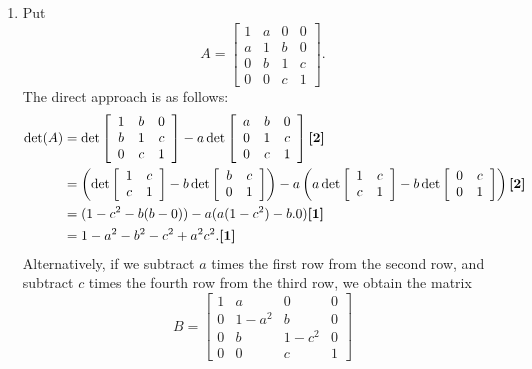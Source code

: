 \documentclass{amsart}
\renewcommand{\:}       {\colon}
\newcommand{\mks}[1]    {\mbox{\bf [#1]}}
\newcommand{\mk}        {\mbox{\bf [1]}}
\begin{document}
\begin{enumerate}
 \item %
  Put
  \[ A = \left[\begin{array}{cccc}
      1 & a & 0 & 0 \\
      a & 1 & b & 0 \\
      0 & b & 1 & c \\
      0 & 0 & c & 1
     \end{array}\right].
  \]
  The direct approach is as follows:
  \begin{align*}
   \det(A) &= 
    \det\left[\begin{array}{ccc} 1&b&0 \\ b&1&c \\ 0&c&1 \end{array}\right] -
    a \det\left[\begin{array}{ccc} a&b&0 \\ 0&1&c \\ 0&c&1 \end{array}\right]
     \mks{2} \\
    &= \left(\det\left[\begin{array}{cc} 1&c\\ c&1\end{array}\right] - 
             b \det\left[\begin{array}{cc} b&c\\ 0&1\end{array}\right]\right) - 
       a\left(a \det\left[\begin{array}{cc} 1&c\\ c&1\end{array}\right] - 
              b \det\left[\begin{array}{cc} 0&c\\ 0&1\end{array}\right]\right)
     \mks{2} \\
    &= (1 - c^2 - b(b-0)) - a(a(1-c^2) - b . 0)  \mk \\
    &= 1-a^2-b^2-c^2+a^2c^2. \mk
  \end{align*}
  Alternatively, if we subtract $a$ times the first row from the second
  row, and subtract $c$ times the fourth row from the third row, we
  obtain the matrix 
  \[ B = \left[\begin{array}{cccc}
      1 & a     & 0     & 0 \\
      0 & 1-a^2 & b     & 0 \\
      0 & b     & 1-c^2 & 0 \\
      0 & 0     & c     & 1
     \end{array}\right]
\]
\end{enumerate}
\end{document}
